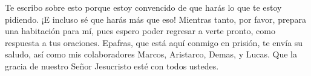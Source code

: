  Te escribo sobre esto porque estoy convencido de que harás
lo que te estoy pidiendo. ¡E incluso sé que harás más que eso!
 Mientras tanto, por favor, prepara una habitación para mí,
pues espero poder regresar a verte pronto, como respuesta a tus
oraciones.  Epafras, que está aquí conmigo en prisión, te
envía su saludo,  así como mis colaboradores Marcos,
Aristarco, Demas, y Lucas.  Que la gracia de nuestro Señor
Jesucristo esté con todos ustedes.
